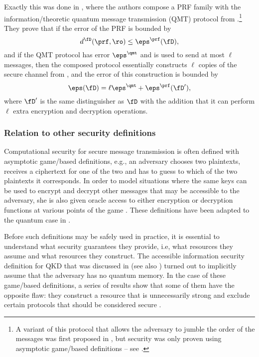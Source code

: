 Exactly this was done in \textcite{BMPZ19}, where the authors compose
a PRF family with the information\-/theoretic quantum message
transmission (QMT) protocol from .\footnote{A variant
  of this protocol that allows the adversary to jumble the order of
  the messages was first proposed in \textcite{AGM18}, but security
  was only proven using asymptotic game\-/based definitions \--- see
  .} They prove that if the error
of the PRF is bounded by
\[
 d^{\fD}(\prf,\ro) \leq \eps^{\prf}(\fD),
\]
and if the QMT protocol has error $\eps^{\qmt}$ and is used to send at
most $\ell$ messages, then the composed protocol essentially
constructs $\ell$ copies of the secure channel from
, and the error of this
construction is bounded by
\[\eps(\fD) = \ell \eps^{\qmt} + \eps^\prf(\fD'),\]
where $\fD'$ is the same distinguisher as $\fD$ with the addition that
it can perform $\ell$ extra encryption and decryption operations.


\subsubsection{Relation to other security definitions}
\label{sec:computational.literature}

Computational security for secure message transmission is often
defined with asymptotic game\-/based definitions, e.g., an adversary
chooses two plaintexts, receives a ciphertext for one of the two and
has to guess to which of the two plaintexts it corresponds. In order
to model situations where the same keys can be used to encrypt and
decrypt other messages that may be accessible to the adversary, she is
also given oracle access to either encryption or decryption functions
at various points of the game \cite{BDPR98,KY06}. These definitions
have been adapted to the quantum case in
\textcite{BJ15,ABFGSSJ16,AGM18}.

Before such definitions may be safely used in practice, it is
essential to understand what security guarantees they provide, i.e, what
resources they assume and what resources they construct. The
accessible information security definition for QKD that was discussed
in  (see also
) turned out to implicitly assume
that the adversary has no quantum memory. In the case of these
game\-/based definitions, a series of results show that some of them
have the opposite flaw: they construct a resource that is
unnecessarily strong and exclude certain protocols that should be
considered secure \cite{CKN03,CMT13,BMPZ19}.

